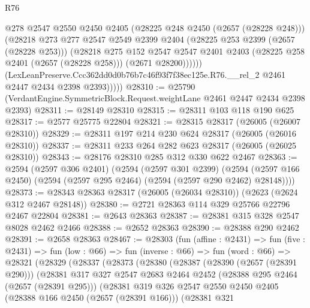 \begin{lexlean}{R76}
\begin{coremodule}
                  @278
                  @2547
                  @2550
                  @2450
                  @2405
                  (@28225 @248 @2450 (@2657 (@28228 @248)))
                  (@28218
                    @273
                    @277
                    @2547
                    @2549
                    @2399
                    @2404
                    (@28225 @253 @2399 (@2657 (@28228 @253)))
                    (@28218
                      @275
                      @152
                      @2547
                      @2547
                      @2401
                      @2403
                      (@28225 @258 @2401 (@2657 (@28228 @258)))
                      (@2671 @28200))))))
            (LexLeanPreserve.Ccc362dd0d0b76b7c46f93f7f38ec125e.R76.__rel_2
              @2461
              @2447
              @2434
              @2398
              @2393)))))
@28310 := @25790 (VerdantEngine.SymmetricBlock.Request.weightLane @2461 @2447 @2434 @2398 @2393)
@28311 := @28149 @28310
@28315 := @28311 @103 @118 @190 @625
@28317 := @2577 @25775 @22804
@28321 := @28315 @28317 (@26005 (@26007 @28310))
@28329 := @28311 @197 @214 @230 @624 @28317 (@26005 (@26016 @28310))
@28337 := @28311 @233 @264 @282 @623 @28317 (@26005 (@26025 @28310))
@28343 := @28176 @28310 @285 @312 @330 @622 @2467
@28363 := @2594
    (@2597 @306 @2401)
    (@2594
      (@2597 @301 @2399)
      (@2594 (@2597 @166 @2450) (@2594 (@2597 @295 @2464) (@2594 (@2597 @290 @2462) @28148))))
@28373 := @28343 @28363 @28317 (@26005 (@26034 @28310)) (@2623 (@2624 @312 @2467 @28148))
@28380 := @2721 @28363 @114 @329 @25766 @22796 @2467 @22804
@28381 := @2643 @28363
@28387 := @28381 @315 @328 @2547 @8028 @2462 @2466
@28388 := @2652 @28363
@28390 := @28388 @290 @2462
@28391 := @2658 @28363
@28467 := @28303
    (fun (affine : @2431) =>
    fun (five : @2431) =>
    fun (low : @66) =>
    fun (inverse : @66) =>
    fun (word : @66) =>
    @28321
      (@28329
        (@28337
          (@28373
            (@28380
              (@28387
                (@28390 (@2657 (@28391 @290)))
                (@28381
                  @317
                  @327
                  @2547
                  @2683
                  @2464
                  @2452
                  (@28388 @295 @2464 (@2657 (@28391 @295)))
                  (@28381
                    @319
                    @326
                    @2547
                    @2550
                    @2450
                    @2405
                    (@28388 @166 @2450 (@2657 (@28391 @166)))
                    (@28381
                      @321

\end{coremodule}
\end{lexlean}
